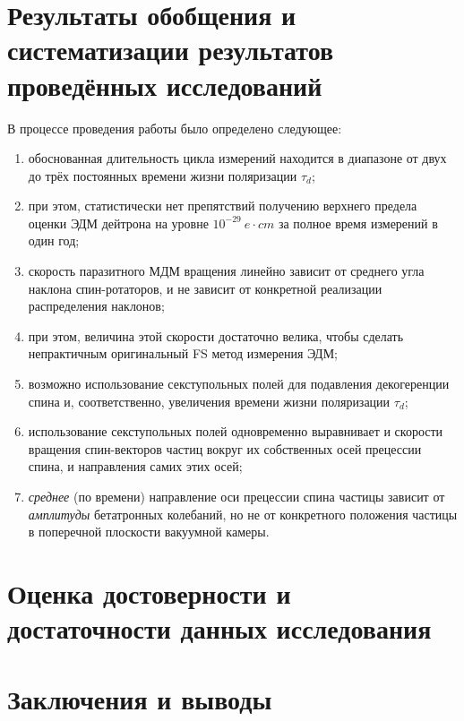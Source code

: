 \documentclass{report}
\newcommand{\LTd}{\tau_d}
\begin{document}
\chapter{Результаты обобщения и систематизации результатов проведённых исследований}

В процессе проведения работы было определено следующее:
\begin{enumerate}
	\item обоснованная длительность цикла измерений находится в диапазоне от двух до трёх постоянных времени жизни поляризации $\LTd$;
	\item при этом, статистически нет препятствий получению верхнего предела оценки ЭДМ дейтрона на уровне $10^{-29}~e\cdot cm$ за полное время измерений в один год;
	\item скорость паразитного МДМ вращения линейно зависит от среднего угла наклона спин-ротаторов, и не зависит от конкретной реализации распределения наклонов;
	\item при этом, величина этой скорости достаточно велика, чтобы сделать непрактичным оригинальный FS метод измерения ЭДМ;
	\item возможно использование секступольных полей для подавления декогеренции спина и, соответственно, увеличения времени жизни поляризации $\LTd$;
	\item использование секступольных полей одновременно выравнивает и скорости вращения спин-векторов частиц вокруг их собственных осей прецессии спина, и направления самих этих осей;
	\item \emph{среднее} (по времени) направление оси прецессии спина частицы зависит от \emph{амплитуды} бетатронных колебаний, но не от конкретного положения частицы в поперечной плоскости вакуумной камеры.
\end{enumerate}

\chapter{Оценка достоверности и достаточности данных исследования}

\chapter{Заключения и выводы}



\end{document}
